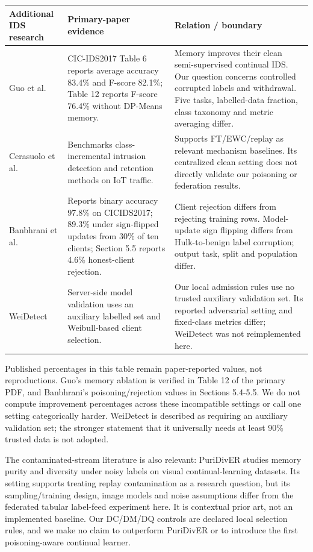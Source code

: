 \documentclass[
  10pt,
  a4paper,
]{article}
\begin{document}
\begin{longtable}[]{@{}
  >{\raggedright\arraybackslash}p{}
  >{\raggedright\arraybackslash}p{}
  >{\raggedright\arraybackslash}p{}@{}}
\toprule
Additional IDS research & Primary-paper evidence & Relation /
boundary \\
\midrule
\endhead
Guo et al.~\cite{guo} & CIC-IDS2017 Table 6 reports average accuracy
83.4\% and F-score 82.1\%; Table 12 reports F-score 76.4\% without
DP-Means memory. & Memory improves their clean semi-supervised continual
IDS. Our question concerns controlled corrupted labels and withdrawal.
Five tasks, labelled-data fraction, class taxonomy and metric averaging
differ. \\
Cerasuolo et al.~\cite{cerasuolo} & Benchmarks class-incremental intrusion
detection and retention methods on IoT traffic. & Supports FT/EWC/replay
as relevant mechanism baselines. Its centralized clean setting does not
directly validate our poisoning or federation results. \\
Banbhrani et al.~\cite{banbhrani} & Reports binary accuracy 97.8\% on
CICIDS2017; 89.3\% under sign-flipped updates from 30\% of ten clients;
Section 5.5 reports 4.6\% honest-client rejection. & Client rejection
differs from rejecting training rows. Model-update sign flipping differs
from Hulk-to-benign label corruption; output task, split and population
differ. \\
WeiDetect \cite{weidetect} & Server-side model validation uses an auxiliary
labelled set and Weibull-based client selection. & Our local admission
rules use no trusted auxiliary validation set. Its reported adversarial
setting and fixed-class metrics differ; WeiDetect was not reimplemented
here. \\
\bottomrule
\end{longtable}

Published percentages in this table remain paper-reported values, not
reproductions. Guo's memory ablation is verified in Table 12 of the
primary PDF, and Banbhrani's poisoning/rejection values in Sections
5.4-5.5. We do not compute improvement percentages across these
incompatible settings or call one setting categorically harder.
WeiDetect is described as requiring an auxiliary validation set; the
stronger statement that it universally needs at least 90\% trusted data
is not adopted.

The contaminated-stream literature is also relevant: PuriDivER \cite{puridiver}
studies memory purity and diversity under noisy labels on visual
continual-learning datasets. Its setting supports treating replay
contamination as a research question, but its sampling/training design,
image models and noise assumptions differ from the federated tabular
label-feed experiment here. It is contextual prior art, not an
implemented baseline. Our DC/DM/DQ controls are declared local selection
rules, and we make no claim to outperform PuriDivER or to introduce the
first poisoning-aware continual learner.
\end{document}
